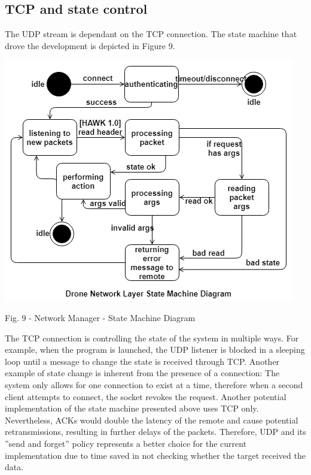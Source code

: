 \documentclass{IEEEtran}
\begin{document}
\subsection*{TCP and state control}
The UDP stream is dependant on the TCP connection. The state machine that drove the development is depicted in Figure 9.
\begin{center}\includegraphics[scale=.45]{net_state_machine.png}\end{center}
\begin{it}\begin{center}Fig. 9 - Network Manager - State Machine Diagram \end{center}\end{it}
The TCP connection is controlling the state of the system in multiple ways. For example, when the program is launched, the UDP listener is blocked in a sleeping loop until a message to change the state is received through TCP. Another example of state change is inherent from the presence of a connection: The system only allows for one connection to exist at a time, therefore when a second client attempts to connect, the socket revokes the request.
\newline
\newline
Another potential implementation of the state machine presented above uses TCP only. Nevertheless, ACKs would double the latency of the remote and cause potential retransmissions, resulting in further delays of the packets. Therefore, UDP  and its ”send and forget” policy represents a better choice for the current implementation due to time saved in not checking whether the target received the data.
\end{document}
